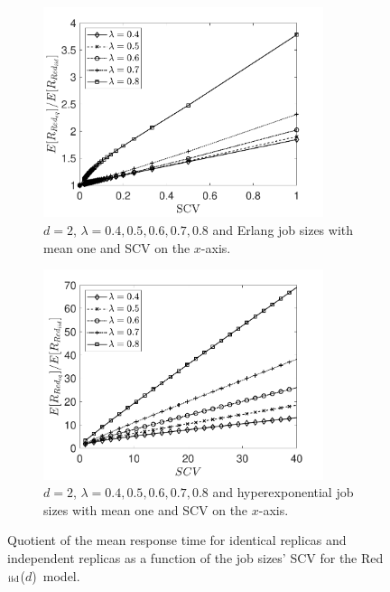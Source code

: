 \documentclass[12pt]{report}
\newcommand{\Redind}{Red$_{\textup{iid}}$($d$)}
\begin{document}
\begin{figure}[t]
\begin{subfigure}{.45\textwidth}
\begin{center}
\includegraphics[width=0.9\textwidth]{figures/Chapter3/plot_MRT_Erlang_quotient_difflam.pdf}
\caption{$d=2$, $\lambda=0.4,0.5,0.6,0.7,0.8$ and Erlang job sizes with mean one and SCV on the $x$-axis.}
\label{fig:compare_difflam1}
\end{center}
\end{subfigure}
\begin{subfigure}{.45\textwidth}
\begin{center}
\includegraphics[width=0.9\textwidth]{figures/Chapter3/plot_ifo_SCV_quotient_HExp_difflam.pdf}
\caption{$d=2$, $\lambda=0.4,0.5,0.6,0.7,0.8$ and hyperexponential job sizes with mean one and SCV on the $x$-axis.}
\label{fig:compare_difflam2}
\end{center}
\end{subfigure}
\caption{Quotient of the mean response time for identical replicas and independent replicas as a function of the job sizes' SCV for the \Redind\ model.}
\label{fig:compare_difflam}
\end{figure}
\end{document}
